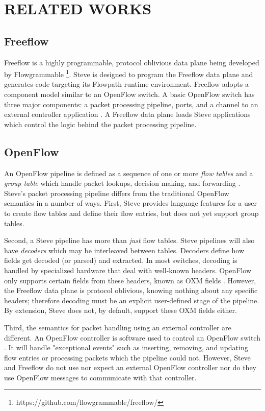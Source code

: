 \chapter{RELATED WORKS} \label{ch:related}

\section{Freeflow} \label{rel:freeflow}

Freeflow is a highly programmable, protocol oblivious data plane being developed
by Flowgrammable \footnote{https://github.com/flowgrammable/freeflow/}. Steve is
designed to program the Freeflow data plane and generates code targeting its
Flowpath runtime environment. Freeflow adopts a component model similar to an OpenFlow switch. A basic OpenFlow switch
has three major components: a packet processing pipeline, ports, and a channel
to an external controller application \cite{openflow_spec}. A Freeflow data
plane loads Steve applications which control the logic behind the packet
processing pipeline.

\section{OpenFlow} \label{rel:openflow}

An OpenFlow pipeline is defined as a sequence
of one or more \textit{flow tables} and a \textit{group table} which handle
packet lookups, decision making, and forwarding \cite{openflow_spec}. Steve's packet processing pipeline differs from the traditional OpenFlow
semantics in a number of ways. First,
Steve provides language features for a user to create flow tables and define
their flow entries, but does not yet support group tables. 

Second, a Steve pipeline has more than \textit{just} flow tables. Steve
pipelines will also have \textit{decoders} which may be interleaved between
tables. Decoders define how fields get decoded (or parsed) and extracted. In
most switches, decoding is handled by specialized hardware that deal with
well-known headers. OpenFlow only supports certain fields from these headers,
known as OXM fields \cite{openflow_spec}. However, the Freeflow data plane is
protocol oblivious, knowing nothing about any specific headers; therefore
decoding must be an explicit user-defined stage of the pipeline. By extension,
Steve does not, by default, support these OXM fields either.

Third, the semantics for packet handling using an external controller are different. An OpenFlow controller is software used to control an OpenFlow switch \cite{openflow_spec}. It will handle "exceptional events" such as inserting,
removing, and updating flow entries or processing packets which the pipeline
could not. However, Steve and Freeflow do not use nor expect an external
OpenFlow controller nor do they use OpenFlow messages to communicate with that
controller. 

